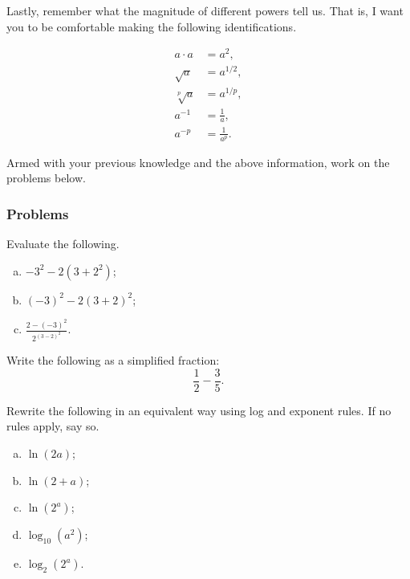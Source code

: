     Lastly, remember what the magnitude of different powers tell us.  That is, I want you to be comfortable making the following identifications.
    
    \begin{align*}
        a\cdot a &= a^2,\\
        \sqrt{a} &= a^{1/2},\\
        \sqrt[p]{a} &= a^{1/p},\\
        a^{-1} &= \frac{1}{a},\\
        a^{-p} &= \frac{1}{a^p}.
    \end{align*}
    
    Armed with your previous knowledge and the above information, work on the problems below.
    
    \subsubsection{Problems}
    
    \begin{problem}
    Evaluate the following.
    \begin{enumerate}[(a)]
        \item $-3^2-2(3+2^2)$;
        \item $(-3)^2-2(3+2)^2$;
        \item $\frac{2-(-3)^2}{2^{(3-2)^2}}$.
    \end{enumerate}
    \end{problem}
    
    \begin{problem}
    Write the following as a simplified fraction:
    \[
    \frac{1}{2}-\frac{3}{5}.
    \]
    \end{problem}
    
    \begin{problem}
    Rewrite the following in an equivalent way using log and exponent rules. If no rules apply, say so.
    \begin{enumerate}[(a)]
        \item $\ln(2a)$;
        \item $\ln(2+a)$;
        \item $\ln(2^a)$;
        \item $\log_{10}(a^2)$;
        \item $\log_2(2^a)$.
    \end{enumerate}
    \end{problem}
    
